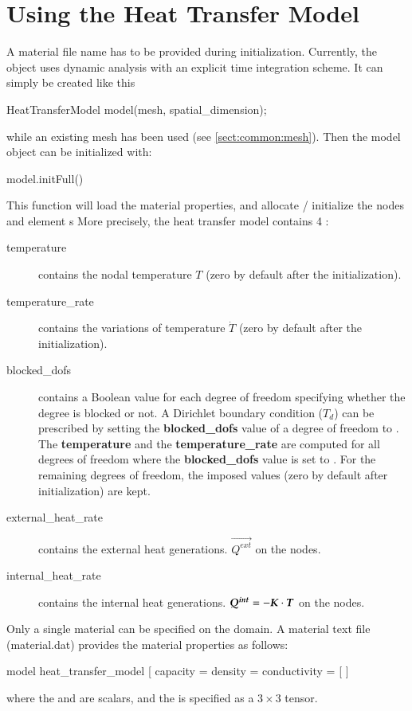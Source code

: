 \section{Using the Heat Transfer Model}
A material file name has to be provided during initialization.
Currently, the  object uses dynamic analysis
with an explicit time integration scheme.  It can simply be created
like this
\begin{cpp}
  HeatTransferModel model(mesh, spatial_dimension);
\end{cpp}
while an existing mesh has been used (see \ref{sect:common:mesh}).
Then the model object can be initialized with:
\begin{cpp}
  model.initFull()
\end{cpp}
This function will load the material
properties, and allocate / initialize the nodes and element s
More precisely, the heat transfer model contains 4 :
\begin{description}
\item[temperature] contains the nodal temperature $T$ (zero  by   default  after  the
  initialization).
\item[temperature\_rate] contains the variations of temperature $\dot{T}$
  (zero  by   default  after  the
  initialization).
\item[blocked\_dofs] contains a Boolean value for each degree of
  freedom specifying whether the degree is blocked or not. A Dirichlet
  boundary condition ($T_d$) can be prescribed by setting the
  \textbf{blocked\_dofs} value of a degree of freedom to .
  The \textbf{temperature} and the \textbf{temperature\_rate} are
  computed for all degrees of freedom where the \textbf{blocked\_dofs}
  value is set to .  For the remaining degrees of freedom,
  the imposed values (zero by default after initialization) are kept.
\item[external\_heat\_rate] contains the external heat generations.  $\vec{Q^{ext}}$
  on the nodes.
\item[internal\_heat\_rate] contains the internal heat generations.  $\boldsymbol{Q^{int}} =  -\boldsymbol{K} \cdot \boldsymbol{T}$  on the nodes.
\end{description}

Only a single material can be specified on the domain.
A material text file (\eg material.dat) provides the material properties as follows:
\begin{cpp}
  model heat_transfer_model [
    capacity = %
    density = %
    conductivity = [%
  ]
\end{cpp}
where the  and  are scalars, and the  is specified as a $3\times 3$ tensor.


